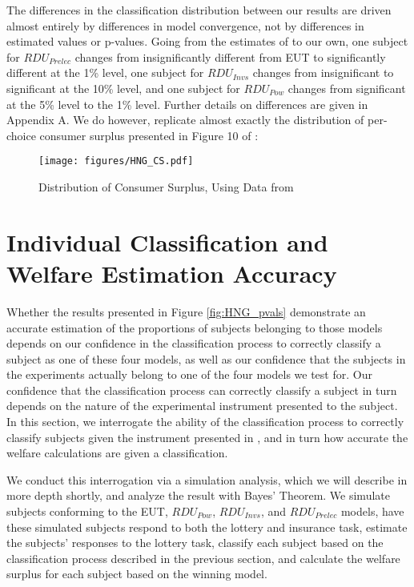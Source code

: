 \documentclass[../main.tex]{subfiles}
\begin{document}
The differences in the classification distribution between our results are driven almost entirely by differences in model convergence, not by differences in estimated values or p-values.
Going from the estimates of \textcite{Harrison2016} to our own, one subject for $\mathit{RDU_{Prelec}}$ changes from insignificantly different from EUT to significantly different at the 1\% level, one subject for $\mathit{RDU_{Invs}}$ changes from insignificant to significant at the 10\% level, and one subject for $\mathit{RDU_{Pow}}$ changes from significant at the 5\% level to the 1\% level.
Further details on differences are given in Appendix A.
We do however, replicate almost exactly the distribution of per-choice consumer surplus presented in Figure 10 of \textcite[108]{Harrison2016}:

\begin{figure}[h!]
	\center
	\caption{Distribution of Consumer Surplus, Using Data from \textcite{Harrison2016}}
	\texttt{[image: figures/HNG\_CS.pdf]}
	\label{fig:HNG_CS}
\end{figure}

\section{Individual Classification and Welfare Estimation Accuracy}

Whether the results presented in Figure \ref{fig:HNG_pvals} demonstrate an accurate estimation of the proportions of subjects belonging to those models depends on our confidence in the classification process to correctly classify a subject as one of these four models, as well as our confidence that the subjects in the experiments actually belong to one of the four models we test for.
Our confidence that the classification process can correctly classify a subject in turn depends on the nature of the experimental instrument presented to the subject.
In this section, we interrogate the ability of the classification process to correctly classify subjects given the instrument presented in \textcite{Harrison2016}, and in turn how accurate the welfare calculations are given a classification.

We conduct this interrogation via a simulation analysis, which we will describe in more depth shortly, and analyze the result with Bayes' Theorem.
We simulate subjects conforming to the EUT, $\mathit{RDU_{Pow}}$, $\mathit{RDU_{Invs}}$, and $\mathit{RDU_{Prelec}}$ models, have these simulated subjects respond to both the lottery and insurance task, estimate the subjects' responses to the lottery task, classify each subject based on the classification process described in the previous section, and calculate the welfare surplus for each subject based on the winning model.
\end{document}
